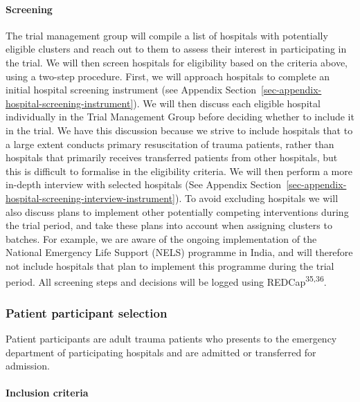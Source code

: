 \documentclass[
]{scrartcl}
\let\oldparagraph\paragraph
\renewcommand{\paragraph}[1]{\oldparagraph{#1}\mbox{}}
\begin{document}
\hypertarget{screening}{%
\paragraph{Screening}\label{screening}}

The trial management group will compile a list of hospitals with
potentially eligible clusters and reach out to them to assess their
interest in participating in the trial. We will then screen hospitals
for eligibility based on the criteria above, using a two-step procedure.
First, we will approach hospitals to complete an initial hospital
screening instrument (see Appendix
Section~\ref{sec-appendix-hospital-screening-instrument}). We will then
discuss each eligible hospital individually in the Trial Management
Group before deciding whether to include it in the trial. We have this
discussion because we strive to include hospitals that to a large extent
conducts primary resuscitation of trauma patients, rather than hospitals
that primarily receives transferred patients from other hospitals, but
this is difficult to formalise in the eligibility criteria. We will then
perform a more in-depth interview with selected hospitals (See Appendix
Section~\ref{sec-appendix-hospital-screening-interview-instrument}). To
avoid excluding hospitals we will also discuss plans to implement other
potentially competing interventions during the trial period, and take
these plans into account when assigning clusters to batches. For
example, we are aware of the ongoing implementation of the National
Emergency Life Support (NELS) programme in India, and will therefore not
include hospitals that plan to implement this programme during the trial
period. All screening steps and decisions will be logged using
REDCap\textsuperscript{35,36}.

\hypertarget{patient-participant-selection}{%
\subsubsection{Patient participant
selection}\label{patient-participant-selection}}

Patient participants are adult trauma patients who presents to the
emergency department of participating hospitals and are admitted or
transferred for admission.

\hypertarget{inclusion-criteria-1}{%
\paragraph{Inclusion criteria}\label{inclusion-criteria-1}}
\end{document}

